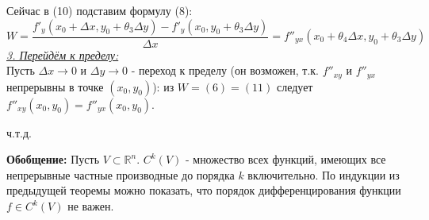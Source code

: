 \documentclass[book, 11pt]{report}
\begin{document}
        Сейчас в (10) подставим формулу (8):
        \begin{equation}
            W=\frac{f'_y(x_0+\Delta x,y_0+\theta_3\Delta y)-f'_y(x_0,y_0+\theta_3\Delta y)}{\Delta x}=f''_{yx}(x_0+\theta_4\Delta x, y_0+\theta_3\Delta y)
        \end{equation}
        \underline{\textit{3. Перейдём к пределу:}}\\
        Пусть $\Delta x\to0$ и $\Delta y\to0$ - переход к пределу (он возможен, т.к. $f''_{xy}$ и $f''_{yx}$ непрерывны в точке $(x_0,y_0)$): из $W=(6)=(11)$ следует $f''_{xy}(x_0,y_0)=f''_{yx}(x_0,y_0)$.
        \par{{\raggedleft ч.т.д.\par}}
        \setcounter{equation}{0}
        \vspace{0.5cm}
        \par{\textbf{Обобщение: }Пусть $V\subset\mathbb{R}^n$. $C^k(V)$ - множество всех функций, имеющих все непрерывные частные производные до порядка $k$ включительно. По индукции из предыдущей теоремы можно показать, что порядок дифференцирования функции $f\in C^k(V)$ не важен.        
        }
\end{document}

